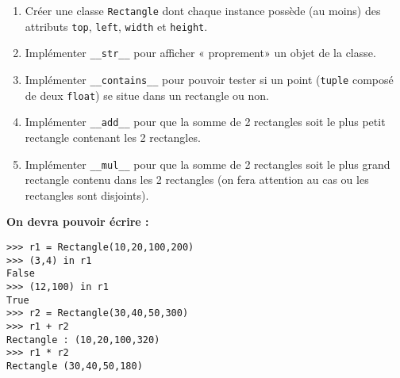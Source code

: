 \documentclass[a4paper,10pt,cours,firamath]{nsi}
\begin{document}
\begin{exercice}[]
	
	\begin{enumerate}
		\item 	Créer une classe \texttt{Rectangle} dont chaque instance possède (au moins) des attributs \texttt{top}, \texttt{left}, \texttt{width} et \texttt{height}.
		\item	Implémenter \texttt{__str__} pour afficher « proprement» un objet de la classe.
		\item   Implémenter \texttt{__contains__} pour pouvoir tester si un point (\texttt{tuple} composé de deux \texttt{float}) se situe dans un rectangle ou non.
		\item 	Implémenter \texttt{__add__} pour que la somme de 2 rectangles soit le plus petit rectangle contenant les 2 rectangles.
		\item 	Implémenter \texttt{__mul__} pour que la somme de 2 rectangles soit le plus grand rectangle contenu dans les 2 rectangles (on fera attention au cas ou les rectangles sont disjoints).
	\end{enumerate}
	\textbf{On devra pouvoir écrire :}
	\begin{verbatim}
>>> r1 = Rectangle(10,20,100,200)
>>> (3,4) in r1
False
>>> (12,100) in r1
True
>>> r2 = Rectangle(30,40,50,300)
>>> r1 + r2
Rectangle : (10,20,100,320)
>>> r1 * r2
Rectangle (30,40,50,180)
\end{verbatim}
\end{exercice}
\end{document}
